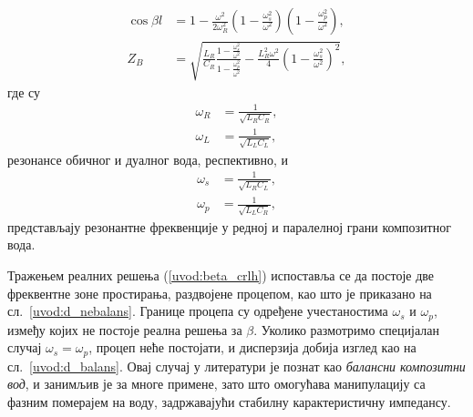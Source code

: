 \documentclass[main.tex]{subfiles}
\begin{document}
\begin{align}
    \cos{\beta l} & = 1 - \frac{\omega^2}{2\omega_R^2}\left( 1 - \frac{\omega_s^2}{\omega^2} \right)\left( 1 - \frac{\omega_p^2}{\omega^2} \right),\label{uvod:beta_crlh} \\
    Z_B & = \sqrt{\frac{L_R}{C_R}\frac{1-\frac{\omega_s^2}{\omega^2}}{1-\frac{\omega_p^2}{\omega^2}} - \frac{L_R^2\omega^2}{4}\left( 1 - \frac{\omega_s^2}{\omega^2} \right)^2},
\end{align}
где су
\begin{align}
    \omega_R & = \frac{1}{\sqrt{L_R C_R} },\\
    \omega_L & = \frac{1}{\sqrt{L_L C_L} },
\end{align}
резонансе обичног и дуалног вода, респективно, и
\begin{align}
    \omega_s & = \frac{1}{\sqrt{L_R C_L} },\\
    \omega_p & = \frac{1}{\sqrt{L_L C_R} },
\end{align}
представљају резонантне фреквенције у редној и паралелној грани композитног вода.

Тражењем реалних решења (\ref{uvod:beta_crlh}) испоставља се да постоје две фреквентне зоне простирања, раздвојене процепом, као што је приказано на сл.~\ref{uvod:d_nebalans}. Границе процепа су одређене учестаностима $\omega_s$ и $\omega_p$, између којих не постоје реална решења за $\beta$. Уколико размотримо специјалан случај $\omega_s = \omega_p$, процеп неће постојати, и дисперзија добија изглед као на сл.~\ref{uvod:d_balans}. Овај случај у литератури је познат као \emph{балансни композитни вод}, и занимљив је за многе примене, зато што омогућава манипулацију са фазним померајем на воду, задржавајући стабилну карактеристичну импедансу.
\end{document}
